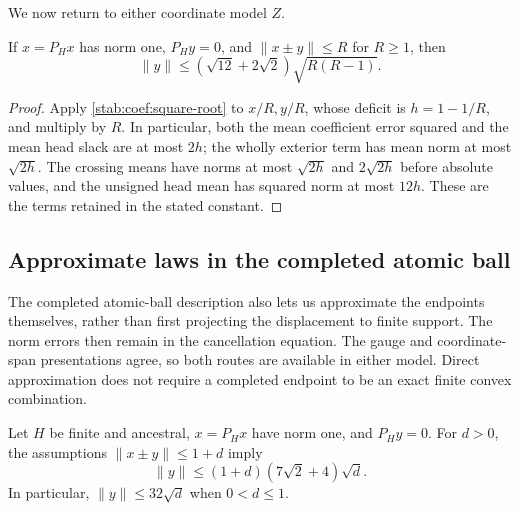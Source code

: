 We now return to either coordinate model $Z$.

\begin{corollary}\label{stab:coef:unit-head-lens}
If $x=P_Hx$ has norm one, $P_Hy=0$, and $\|x\pm y\|\le R$
for $R\ge1$, then
\begin{equation}\label{stab:coef:unit-head-lens-eq}
 \|y\|\le(\sqrt{12}+2\sqrt2)\sqrt{R(R-1)}.
\end{equation}
\end{corollary}

\begin{proof}
Apply \eqref{stab:coef:square-root} to $x/R,y/R$, whose deficit
is $h=1-1/R$, and multiply by $R$. In particular, both the mean
coefficient error squared and the mean head slack are at most $2h$;
the wholly exterior term has mean norm at most $\sqrt{2h}$.
The crossing means have norms at most $\sqrt{2h}$ and
$2\sqrt{2h}$ before absolute values, and the unsigned head mean
has squared norm at most $12h$. These are the terms retained in
the stated constant.
\end{proof}

\subsection{Approximate laws in the completed atomic ball}
\label{stab:coef:approximate}

The completed atomic-ball description also lets us approximate the
endpoints themselves, rather than first projecting the displacement
to finite support. The norm errors then remain in the cancellation
equation. The gauge and coordinate-span presentations agree, so both
routes are available in either model. Direct approximation does not
require a completed endpoint to be an exact finite convex combination.

\begin{proposition}\label{stab:coef:approximate-tail}
Let $H$ be finite and ancestral, $x=P_Hx$ have norm one, and
$P_Hy=0$. For $d>0$, the assumptions $\|x\pm y\|\le1+d$ imply
\begin{equation}\label{stab:coef:approximate-tail-eq}
 \|y\|\le(1+d)(7\sqrt2+4)\sqrt d.
\end{equation}
In particular, $\|y\|\le32\sqrt d$ when $0<d\le1$.
\end{proposition}


